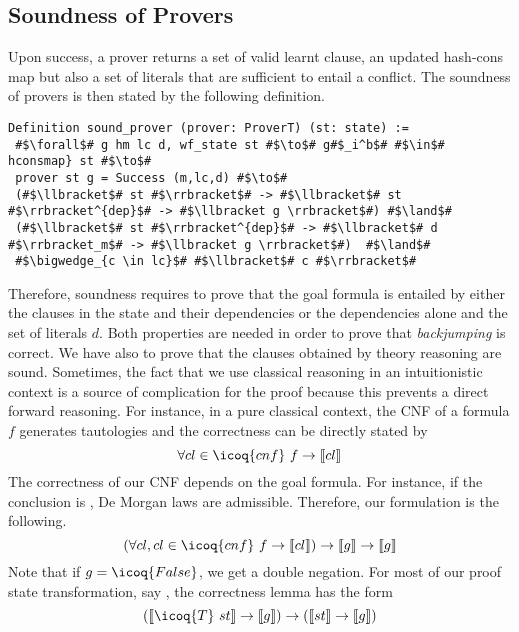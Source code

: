 \documentclass[a4paper,UKenglish,cleveref, autoref, thm-restate]{lipics-v2019}
\begin{document}
\subsection{Soundness of Provers}
Upon success, a prover  returns a set of valid learnt
clause, an updated hash-cons map but also a set of literals that are
sufficient to entail a conflict.  The soundness of provers is then
stated by the following definition.
\begin{verbatim}
Definition sound_prover (prover: ProverT) (st: state) :=
 #$\forall$# g hm lc d, wf_state st #$\to$# g#$_i^b$# #$\in$# hconsmap} st #$\to$#
 prover st g = Success (m,lc,d) #$\to$#
 (#$\llbracket$# st #$\rrbracket$# -> #$\llbracket$# st #$\rrbracket^{dep}$# -> #$\llbracket g \rrbracket$#) #$\land$#
 (#$\llbracket$# st #$\rrbracket^{dep}$# -> #$\llbracket$# d #$\rrbracket_m$# -> #$\llbracket g \rrbracket$#)  #$\land$#
 #$\bigwedge_{c \in lc}$# #$\llbracket$# c #$\rrbracket$#
\end{verbatim}
Therefore, soundness requires to prove that the goal formula 
is entailed by either the clauses in the state and their dependencies
or the dependencies alone and the set of literals $d$.
%
Both properties are needed in order to prove that \emph{backjumping} is correct.
We have also to prove that the clauses  obtained by theory reasoning are
sound. 
%
Sometimes, the fact that we use classical reasoning in an
intuitionistic context is a source of complication for the proof
because this prevents a direct forward reasoning. 
%
For instance, in a pure classical context, the CNF
of a formula $f$ generates tautologies and the correctness can be
directly stated by
\[
  \forall cl \in \icoq{cnf}\ f \to \llbracket cl \rrbracket
\]
The correctness of our CNF depends on the goal formula. For instance,
if the conclusion is , De Morgan laws are admissible.
Therefore, our formulation is the following.
\[
  (\forall cl, cl \in \icoq{cnf}\ f \to \llbracket cl \rrbracket) \to \llbracket g\rrbracket \to \llbracket g\rrbracket
\]
Note that if $g=\icoq{False}$, we get a double negation.
For most of our proof state transformation, say , the correctness lemma has the form
\[
  (\llbracket \icoq{T}\ st \rrbracket \to \llbracket g \rrbracket) \to 
  (\llbracket st \rrbracket \to \llbracket g \rrbracket)
\]
\end{document}
